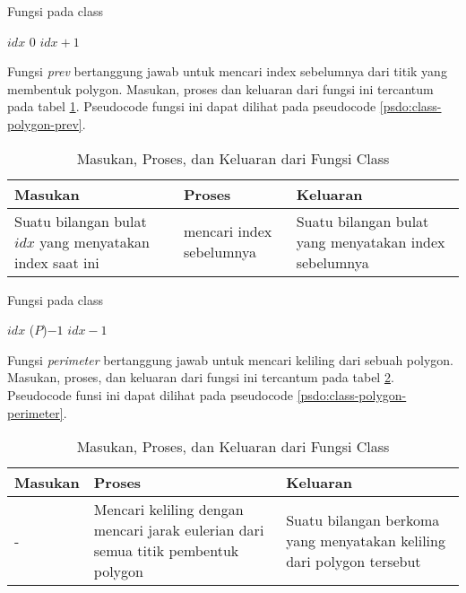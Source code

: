 \begin{algorithm}
    \caption{Fungsi  pada class }
	\label{psdo:class-polygon-next}
	\begin{algorithmic}[1]
        \Require $ idx $
            \State \Return $0$
        \Else
            \State \Return $idx+1$
		\EndIf
	\end{algorithmic}
\end{algorithm}

Fungsi \textit{prev} bertanggung jawab untuk mencari index sebelumnya dari titik yang membentuk polygon. Masukan, proses dan keluaran dari fungsi ini tercantum pada tabel \ref{tab:class-polygon-prev}. Pseudocode fungsi ini dapat dilihat pada pseudocode \ref{psdo:class-polygon-prev}.

\begin{table}[]
	\Centering
	\begin{tabular}{|p{3cm}|p{3cm}|p{3cm}|}
	\hline
	Masukan   & Proses     & Keluaran \\ \hline
	Suatu bilangan bulat $idx$ yang menyatakan index saat ini & mencari index sebelumnya &   Suatu bilangan bulat yang menyatakan index sebelumnya     \\ \hline
	\end{tabular}
	\caption{Masukan, Proses, dan Keluaran dari Fungsi  Class }
	\label{tab:class-polygon-prev}
\end{table}

\begin{algorithm}
    \caption{Fungsi  pada class }
	\label{psdo:class-polygon-prev}
	\begin{algorithmic}[1]
        \Require $ idx $
            \State \Return {}($P$)$-1$
        \Else
            \State \Return $idx-1$
		\EndIf
	\end{algorithmic}
\end{algorithm}

Fungsi \textit{perimeter} bertanggung jawab untuk mencari keliling dari sebuah polygon. Masukan, proses, dan keluaran dari fungsi ini tercantum pada tabel \ref{tab:class-polygon-perimeter}. Pseudocode funsi ini dapat dilihat pada pseudocode \ref{psdo:class-polygon-perimeter}.
\begin{table}[]
	\Centering
	\begin{tabular}{|p{3cm}|p{3cm}|p{3cm}|}
	\hline
	Masukan   & Proses     & Keluaran \\ \hline
	- & Mencari keliling dengan mencari jarak eulerian dari semua titik pembentuk polygon &   Suatu bilangan berkoma yang menyatakan keliling dari polygon tersebut     \\ \hline
	\end{tabular}
	\caption{Masukan, Proses, dan Keluaran dari Fungsi  Class }
	\label{tab:class-polygon-perimeter}
\end{table}

